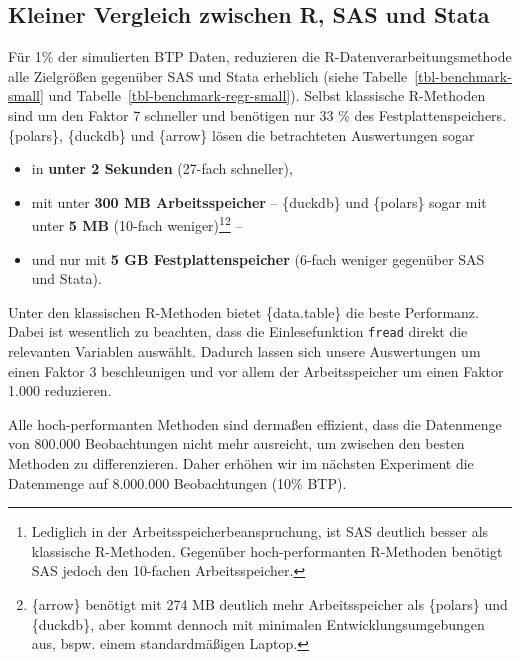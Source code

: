 \documentclass[
  german,
  10pt,
  twoside]{article}
\providecommand{\tightlist}{%
  \setlength{\itemsep}{0pt}\setlength{\parskip}{0pt}}
\let\oldref\ref
\renewcommand{\ref}[1]{\oldref{#1}\raisebox{-0.2ex}{\scriptsize\color{wistaBlue}\ding{247}}}
\begin{document}
\subsection{Kleiner Vergleich zwischen R, SAS und
Stata}\label{kleiner-vergleich-zwischen-r-sas-und-stata}

Für 1\% der simulierten BTP Daten, reduzieren die
R-Datenverarbeitungsmethode alle Zielgrößen gegenüber SAS und Stata
erheblich (siehe Tabelle~\ref{tbl-benchmark-small} und
Tabelle~\ref{tbl-benchmark-regr-small}). Selbst klassische R-Methoden
sind um den Faktor 7 schneller und benötigen nur 33 \% des
Festplattenspeichers. \{polars\}, \{duckdb\} und \{arrow\} lösen die
betrachteten Auswertungen sogar

\begin{itemize}
\tightlist
\item
  in \textbf{unter 2 Sekunden} (27-fach schneller),
\item
  mit unter \textbf{300 MB Arbeitsspeicher} -- \{duckdb\} und \{polars\}
  sogar mit unter \textbf{5 MB} (10-fach weniger)\footnote{Lediglich in
    der Arbeitsspeicherbeanspruchung, ist SAS deutlich besser als
    klassische R-Methoden. Gegenüber hoch-performanten R-Methoden
    benötigt SAS jedoch den 10-fachen Arbeitsspeicher.}\footnote{\{arrow\}
    benötigt mit 274 MB deutlich mehr Arbeitsspeicher als \{polars\} und
    \{duckdb\}, aber kommt dennoch mit minimalen Entwicklungsumgebungen
    aus, bspw. einem standardmäßigen Laptop.} --
\item
  und nur mit \textbf{5 GB Festplattenspeicher} (6-fach weniger
  gegenüber SAS und Stata).
\end{itemize}

Unter den klassischen R-Methoden bietet \{data.table\} die beste
Performanz. Dabei ist wesentlich zu beachten, dass die Einlesefunktion
\texttt{fread} direkt die relevanten Variablen auswählt. Dadurch lassen
sich unsere Auswertungen um einen Faktor 3 beschleunigen und vor allem
der Arbeitsspeicher um einen Faktor 1.000 reduzieren.

Alle hoch-performanten Methoden sind dermaßen effizient, dass die
Datenmenge von 800.000 Beobachtungen nicht mehr ausreicht, um zwischen
den besten Methoden zu differenzieren. Daher erhöhen wir im nächsten
Experiment die Datenmenge auf 8.000.000 Beobachtungen (10\% BTP).
\end{document}
